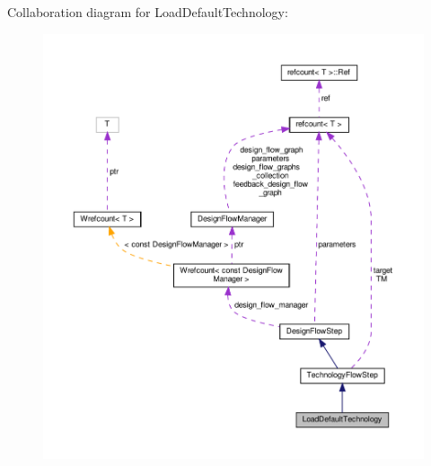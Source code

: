 Collaboration diagram for Load\+Default\+Technology\+:
\nopagebreak
\begin{figure}[H]
\begin{center}
\leavevmode
\includegraphics[width=350pt]{df/d31/classLoadDefaultTechnology__coll__graph}
\end{center}
\end{figure}
